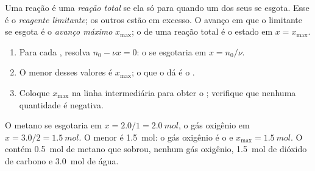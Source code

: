 \begin{definition}\label{def:g10:reaction-progress-table:limiting}
Uma reação é uma \emph{reação total} se ela só para
quando um dos seus  se esgota. Esse  é o
\emph{reagente limitante}; os outros 
estão em excesso. O avanço em que o  limitante se esgota é o
\emph{avanço máximo} $x_{\max}$; o  de
uma reação total é o estado em $x = x_{\max}$.
\end{definition}

\begin{method}\label{met:g10:reaction-progress-table:limiting}
\begin{enumerate}
  \item Para cada , resolva $n_0 - \nu x = 0$: o  se
        esgotaria em $x = n_0 / \nu$.
  \item O menor desses valores é $x_{\max}$; o  que o dá é o
        .
  \item Coloque $x_{\max}$ na linha intermediária para obter o ; verifique que nenhuma quantidade é negativa.
\end{enumerate}
\end{method}

\begin{example}\label{ex:g10:reaction-progress-table:methane-final}
O metano se esgotaria em $x = 2.0/1 = \qty{2.0}{mol}$, o gás oxigênio em
$x = 3.0/2 = \qty{1.5}{mol}$. O menor é \qty{1.5}{mol}: o gás oxigênio é
o  e $x_{\max} = \qty{1.5}{mol}$. O 
contém \qty{0.5}{mol} de metano que sobrou, nenhum gás oxigênio,
\qty{1.5}{mol} de dióxido de carbono e \qty{3.0}{mol} de água.
\end{example}

